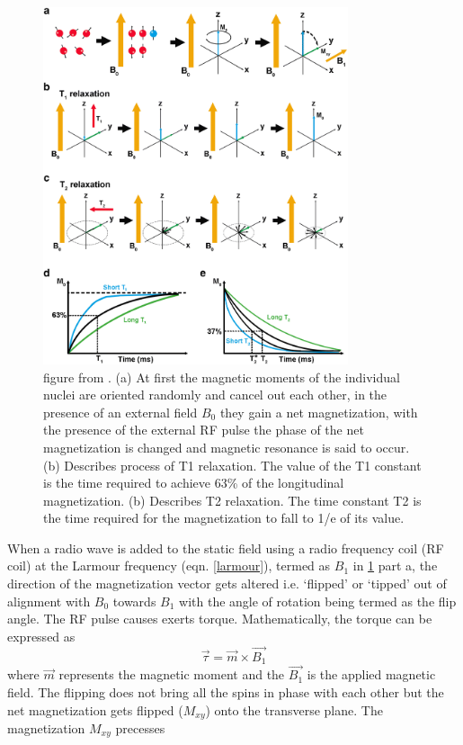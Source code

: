 \documentclass[msthesis.tex]{subfiles}
\begin{document}
\begin{figure}
\includegraphics[width=0.8\textwidth]{images/mri1.png}
\caption{figure from \cite{Mastrogiacomo2019}. (a) At first the magnetic moments of the individual nuclei are oriented randomly and cancel out each other, in the presence of an external field $B_0$ they gain a net magnetization, with the presence of the external RF pulse the phase of the net magnetization is changed and magnetic resonance is said to occur. (b) Describes process of T1 relaxation. The value of the T1 constant is the time required to achieve 63\% of the longitudinal magnetization. (b) Describes T2 relaxation. The time constant T2 is the time required for the magnetization to fall to 1/e of its value.}
\label{mriphysics}
\end{figure}

When a radio wave is added to the static field using a radio frequency coil (RF coil) at the Larmour frequency (eqn. \ref{larmour}), termed as $B_1$ in \ref{mriphysics} part a, the direction of the magnetization vector gets altered i.e. ‘flipped’ or ‘tipped’ out of alignment with $B_0$ towards $B_1$ with the angle of rotation being termed as the flip angle. The RF pulse causes exerts torque. Mathematically, the torque can be expressed as
\begin{equation}
    \Vec{\tau} = \Vec{m} \times \Vec{B_1}
\end{equation}
where $\Vec{m}$ represents the magnetic moment and the $ \Vec{B_1}$ is the applied magnetic field.
 The flipping does not bring all the spins in phase with each other but the net magnetization gets flipped ($M_{xy}$) onto the transverse plane. The magnetization $M_{xy}$ precesses 
\end{document}
